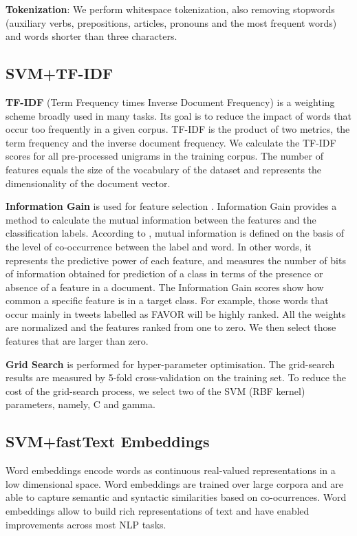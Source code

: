 \documentclass[10pt, a4paper]{article}
\begin{document}
\textbf{Tokenization}: We perform whitespace tokenization, also removing stopwords (auxiliary verbs, prepositions, articles, pronouns and the most frequent words) and words shorter than three characters.

\subsection{SVM+TF-IDF}\label{sec:tf-idf+svm}

\textbf{TF-IDF} (Term Frequency times Inverse Document Frequency) \cite{Jones72astatistical} is a weighting scheme broadly used in many tasks. Its goal is to reduce the impact of words that occur too frequently in a given corpus. TF-IDF is the product of two metrics, the term frequency and the inverse document frequency.
We calculate the TF-IDF scores for all pre-processed unigrams in the training corpus. The number of features equals the size of the vocabulary of the dataset and represents the dimensionality of the document vector.

\textbf{Information Gain} is used for feature selection \cite{Cover:2006:EIT:1146355}. Information Gain provides a method to calculate the mutual information between the features and the classification labels. According to \cite{Aggarwal12}, mutual information is defined on the basis of the level of co-occurrence between the label and word. In other words, it represents the predictive power of each feature, and measures the number of bits of information obtained for prediction of a class in terms of the presence or absence of a feature in a document. The Information Gain scores show how common a specific feature is in a target class. For example, those words that occur mainly in tweets labelled as FAVOR will be highly ranked. All the weights are normalized and the features ranked from one to zero. We then select those features that are larger than zero.

\textbf{Grid Search} is performed for hyper-parameter optimisation. The grid-search results are measured by 5-fold cross-validation on the training set. To reduce the cost of the grid-search process, we select two of the SVM (RBF kernel) parameters, namely, C and gamma.

\subsection{SVM+fastText Embeddings}\label{sec:svm+f-embedd}

Word embeddings encode words as continuous real-valued representations in a low dimensional space. Word embeddings are trained over large corpora and are able to capture semantic and syntactic similarities based on co-ocurrences. Word embeddings allow to build rich representations of text and have enabled improvements across most NLP tasks.
\end{document}
